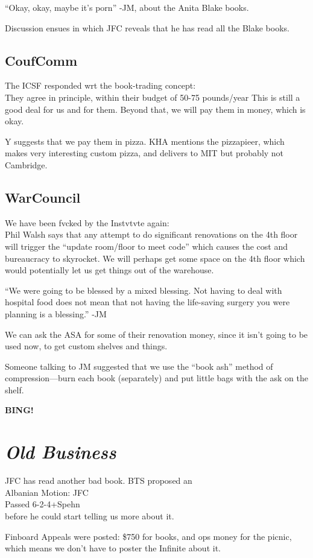 \documentclass[10pt]{article}
\newcommand{\bing}{{\bf BING!} }
\newcommand{\goto}[1]{\bing \vskip 12pt \section*{{\em{#1}}}}
\begin{document}
``Okay, okay, maybe it's porn'' -JM, about the Anita Blake books.

Discussion ensues in which JFC reveals that he has read all the Blake
books.

\subsection*{CoufComm}
The ICSF responded wrt the book-trading concept:\\
They agree in principle, within their budget of 50-75 pounds/year
This is still a good deal for us and for them.
Beyond that, we will pay them in money, which is okay.

Y suggests that we pay them in pizza. KHA mentions the pizzapieer,
which makes very interesting custom pizza, and delivers to MIT but
probably not Cambridge.

\subsection*{WarCouncil}
We have been fvcked by the Instvtvte again:\\
Phil Walsh says that any attempt to do significant renovations on the
4th floor will trigger the ``update room/floor to meet code'' which
causes the cost and bureaucracy to skyrocket.  We will perhaps get
some space on the 4th floor which would potentially let us get things
out of the warehouse.

``We were going to be blessed by a mixed blessing.  Not having to deal
with hospital food does not mean that not having the life-saving
surgery you were planning is a blessing.'' -JM

We can ask the ASA for some of their renovation money, since it isn't
going to be used now, to get custom shelves and things.

Someone talking to JM suggested that we use the ``book ash'' method of
compression---burn each book (separately) and put little bags with the
ask on the shelf.

\goto{Old Business}
JFC has read another bad book.  BTS proposed an \\
Albanian Motion: JFC\\
Passed 6-2-4+Spehn\\
before he could start telling us more about it.

Finboard Appeals were posted: \$750 for books, and ops money for the
picnic, which means we don't have to poster the Infinite about it.
\end{document}
